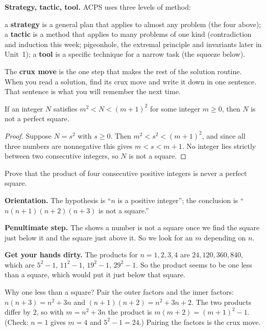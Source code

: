 \documentclass[10pt]{scrartcl}
\begin{document}
\noindent\textbf{Strategy, tactic, tool.} ACPS uses three levels of method:
\begin{itemize}
  \ii a \textbf{strategy} is a general plan that applies to almost any problem (the four above);
  \ii a \textbf{tactic} is a method that applies to many problems of one kind (contradiction and induction this week; pigeonhole, the extremal principle and invariants later in Unit~1);
  \ii a \textbf{tool} is a specific technique for a narrow task (the squeeze below).
\end{itemize}
The \textbf{crux move} is the one step that makes the rest of the solution routine. When you read a solution, find its crux move and write it down in one sentence. That sentence is what you will remember the next time.

\begin{fact*}
  If an integer $N$ satisfies $m^2 < N < (m+1)^2$ for some integer $m \geq 0$, then $N$ is not a perfect square.
\end{fact*}
\begin{proof}
  Suppose $N = s^2$ with $s \geq 0$. Then $m^2 < s^2 < (m+1)^2$, and since all three numbers are nonnegative this gives $m < s < m+1$. No integer lies strictly between two consecutive integers, so $N$ is not a square.
\end{proof}

\begin{example*}
  Prove that the product of four consecutive positive integers is never a perfect square.
\end{example*}

\textbf{Orientation.} The hypothesis is ``$n$ is a positive integer''; the conclusion is ``$n(n+1)(n+2)(n+3)$ is not a square.''

\textbf{Penultimate step.} The  shows a number is not a square once we find the square just below it and the square just above it. So we look for an $m$ depending on $n$.

\textbf{Get your hands dirty.} The products for $n = 1, 2, 3, 4$ are $24, 120, 360, 840$, which are $5^2 - 1$, $11^2 - 1$, $19^2 - 1$, $29^2 - 1$. So the product seems to be one less than a square, which would put it just below that square.

\begin{ideabox}
  Why one less than a square? Pair the outer factors and the inner factors: $n(n+3) = n^2 + 3n$ and $(n+1)(n+2) = n^2 + 3n + 2$. The two products differ by $2$, so with $m = n^2 + 3n$ the product is $m(m+2) = (m+1)^2 - 1$. (Check: $n = 1$ gives $m = 4$ and $5^2 - 1 = 24$.) Pairing the factors is the crux move.
\end{ideabox}
\end{document}
